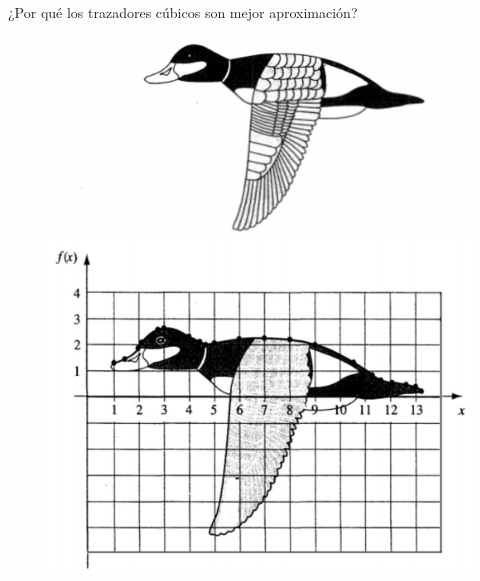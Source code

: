 \documentclass[12pt]{beamer}
\begin{document}
\begin{frame}{¿Por qué los trazadores cúbicos son mejor aproximación?}
\begin{figure}[H]
\centering
\includegraphics[scale=0.15]{77353545_2546339105577443_6082688536073469952_n.jpg} 
\includegraphics[scale=0.15]{74614877_953192571727341_6632384722930499584_n.jpg} 
\end{figure}
\end{frame}
\end{document}
